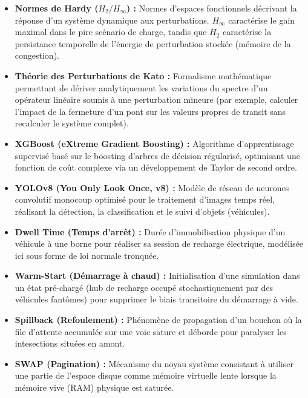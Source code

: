 \documentclass[10pt, a4paper]{article}
\begin{document}
\begin{itemize}
  \textbf{Constante de Kreiss (\(K\)) :} Métrique caractérisant
  l'amplitude maximale de l'amplification transitoire des perturbations
  avant le retour à l'équilibre asymptotique, traduisant la
  vulnérabilité d'un réseau aux embouteillages en cascade.
\item
  \textbf{Normes de Hardy (\(H_2 / H_\infty\)) :} Normes d'espaces
  fonctionnels décrivant la réponse d'un système dynamique aux
  perturbations. \(H_\infty\) caractérise le gain maximal dans le pire
  scénario de charge, tandis que \(H_2\) caractérise la persistance
  temporelle de l'énergie de perturbation stockée (mémoire de la
  congestion).
\item
  \textbf{Théorie des Perturbations de Kato :} Formalisme mathématique
  permettant de dériver analytiquement les variations du spectre d'un
  opérateur linéaire soumis à une perturbation mineure (par exemple,
  calculer l'impact de la fermeture d'un pont sur les valeurs propres de
  transit sans recalculer le système complet).
\item
  \textbf{XGBoost (eXtreme Gradient Boosting) :} Algorithme
  d'apprentissage supervisé basé sur le boosting d'arbres de décision
  régularisé, optimisant une fonction de coût complexe via un
  développement de Taylor de second ordre.
\item
  \textbf{YOLOv8 (You Only Look Once, v8) :} Modèle de réseau de
  neurones convolutif monocoup optimisé pour le traitement d'images
  temps réel, réalisant la détection, la classification et le suivi
  d'objets (véhicules).
\item
  \textbf{Dwell Time (Temps d'arrêt) :} Durée d'immobilisation physique
  d'un véhicule à une borne pour réaliser sa session de recharge
  électrique, modélisée ici sous forme de loi normale tronquée.
\item
  \textbf{Warm-Start (Démarrage à chaud) :} Initialisation d'une
  simulation dans un état pré-chargé (hub de recharge occupé
  stochastiquement par des véhicules fantômes) pour supprimer le biais
  transitoire du démarrage à vide.
\item
  \textbf{Spillback (Refoulement) :} Phénomène de propagation d'un
  bouchon où la file d'attente accumulée sur une voie sature et déborde
  pour paralyser les intesections situées en amont.
\item
  \textbf{SWAP (Pagination) :} Mécanisme du noyau système consistant à
  utiliser une partie de l'espace disque comme mémoire virtuelle lente
  lorsque la mémoire vive (RAM) physique est saturée.
\end{itemize}
\end{document}
